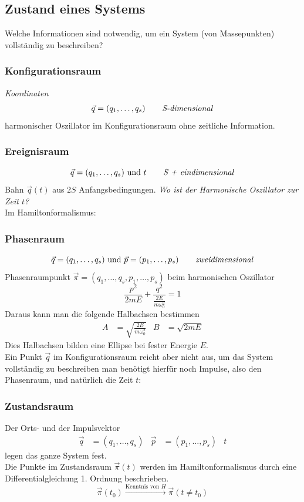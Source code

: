 \subsection{Zustand eines Systems}
Welche Informationen sind notwendig, um ein System (von Massepunkten) vollständig zu beschreiben?
\subsubsection{Konfigurationsraum} \textit{Koordinaten}
\begin{align*}
  \vec{q} = (q_1, \dots, q_s) \text{\textit{\qquad S-dimensional}}
\end{align*}
harmonischer Oszillator im Konfigurationsraum ohne zeitliche Information.

\subsubsection{Ereignisraum}
$$\vec{q} = (q_1, \dots, q_s) \text{~und~} t \text{\textit{\qquad S + eindimensional}}$$
\conseq Bahn $\vec{q}(t)$ aus $2S$ Anfangsbedingungen. \textit{Wo ist der Harmonische Oszillator zur Zeit $t$?}\\

Im Hamiltonformalismus:

\subsubsection{Phasenraum}
$$\vec{q} = (q_1, \dots, q_s) \text{~und~} \vec{p} = (p_1, \dots, p_s) \text{\textit{\qquad zweidimensional}}$$
\conseq Phasenraumpunkt $\vec{\pi} = (q_1, \dots, q_s, p_1, \dots, p_s)$
beim harmonischen Oszillator
$$\frac{p^2}{2 m E} + \frac{q^2}{\frac{2 E}{m \omega_0^2}} = 1$$
Daraus kann man die folgende Halbachsen bestimmen
\begin{align*}
A &= \sqrt{\frac{2 E}{m \omega_0^2}}  &   B &= \sqrt{2 m E}
\end{align*}
Dies Halbachsen bilden eine Ellipse bei fester Energie $E$.\\
Ein Punkt $\vec{q}$ im Konfigurationsraum reicht aber nicht aus, um das System vollständig zu beschreiben man benötigt hierfür noch Impulse, also den Phasenraum, und natürlich die Zeit $t$:

\subsubsection{Zustandsraum}
Der Orts- und der Impulsvektor
\begin{align*}
	\vec{q} &= (q_1, \dots, q_s) & \vec{p} &= (p_1, \dots, p_s) & t
\end{align*}
legen das ganze System fest.\\
Die Punkte im Zustandsraum $\vec{\pi} (t)$ werden im Hamiltonformalismus durch eine Differentialgleichung 1. Ordnung beschrieben.
$$\vec{\pi}(t_0) \xrightarrow{\text{Kenntnis von $H$}} \vec{\pi}(t \neq t_0)$$

